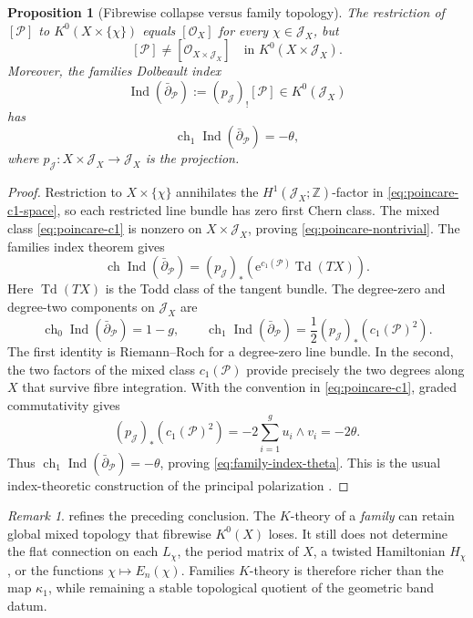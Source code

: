 \documentclass[11pt]{article}
\newtheorem{proposition}[theorem]{Proposition}
\theoremstyle{definition}
\theoremstyle{remark}
\newtheorem{remark}[theorem]{Remark}
\newcommand{\ZZ}{\mathbb Z}
\newcommand{\ch}{\operatorname{ch}}
\newcommand{\Ind}{\operatorname{Ind}}
\newcommand{\cP}{\mathcal P}
\newcommand{\cO}{\mathcal O}
\newcommand{\e}{\mathrm e}
\begin{document}
\begin{proposition}[Fibrewise collapse versus family topology]
\label{prop:poincare-family}
The restriction of \([\cP]\) to \(K^0(X\times\{\chi\})\) equals
\([\cO_X]\) for every \(\chi\in\mathcal J_X\), but
\[
                  [\cP]\neq[\cO_{X\times\mathcal J_X}]
                  \quad\text{in }K^0(X\times\mathcal J_X).
                  \tag{3.7}\label{eq:poincare-nontrivial}
\]
Moreover, the families Dolbeault index
\[
       \Ind(\bar\partial_{\cP})
       :=(p_{\mathcal J})_![\cP]\in K^0(\mathcal J_X)
       \tag{3.8}\label{eq:family-index}
\]
has
\[
 \ch_1\Ind(\bar\partial_{\cP})=-\theta,
 \tag{3.8a}\label{eq:family-index-theta}
\]
where \(p_{\mathcal J}:X\times\mathcal J_X\to\mathcal J_X\) is the
projection.
\end{proposition}

\begin{proof}
Restriction to \(X\times\{\chi\}\) annihilates the
\(H^1(\mathcal J_X;\ZZ)\)-factor in \eqref{eq:poincare-c1-space}, so each
restricted
line bundle has zero first Chern class.  The mixed class
\eqref{eq:poincare-c1} is nonzero on \(X\times\mathcal J_X\), proving
\eqref{eq:poincare-nontrivial}.  The families index theorem gives
\[
 \ch\Ind(\bar\partial_{\cP})
   =(p_{\mathcal J})_*\!\left(
       \e^{c_1(\cP)}\operatorname{Td}(TX)
     \right).
 \tag{3.9}\label{eq:family-index-ch}
\]
Here \(\operatorname{Td}(TX)\) is the Todd class of the tangent bundle.
The degree-zero and degree-two components on \(\mathcal J_X\) are
\[
 \ch_0\Ind(\bar\partial_{\cP})=1-g,
 \qquad
 \ch_1\Ind(\bar\partial_{\cP})
     =\frac12(p_{\mathcal J})_*\!\left(c_1(\cP)^2\right).
 \tag{3.9a}\label{eq:family-index-low-components}
\]
The first identity is Riemann--Roch for a degree-zero line bundle.  In the
second, the two factors of the mixed class \(c_1(\cP)\) provide precisely the
two degrees along \(X\) that survive fibre integration.  With the convention
in \eqref{eq:poincare-c1}, graded commutativity gives
\[
 (p_{\mathcal J})_*\!\left(c_1(\cP)^2\right)
      =-2\sum_{i=1}^g u_i\wedge v_i=-2\theta.
\]
Thus \(\ch_1\Ind(\bar\partial_{\cP})=-\theta\), proving
\eqref{eq:family-index-theta}.  This is the usual index-theoretic
construction of the principal polarization
\cite{AtiyahSingerFamilies,BirkenhakeLange}.
\end{proof}

\begin{remark}
 refines the preceding conclusion.  The
\(K\)-theory of a \emph{family} can retain global mixed topology that
fibrewise \(K^0(X)\) loses.  It still does not determine the flat connection
on each \(L_\chi\), the period matrix of \(X\), a twisted Hamiltonian
\(H_\chi\), or the functions \(\chi\mapsto E_n(\chi)\).  Families
\(K\)-theory is therefore richer than the map \(\kappa_1\), while remaining a
stable topological quotient of the geometric band datum.
\end{remark}
\end{document}
